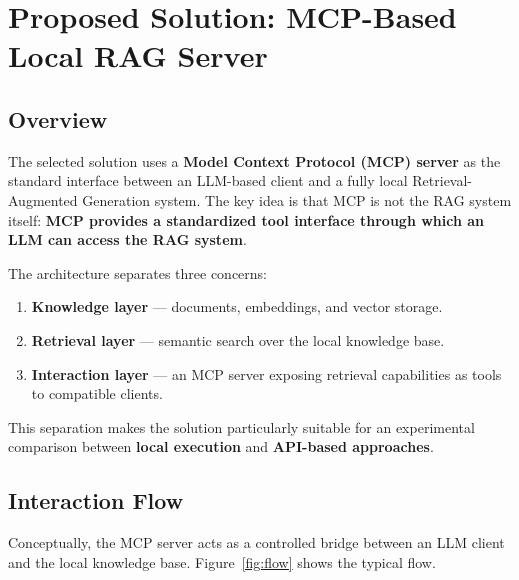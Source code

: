 \documentclass[11pt,a4paper]{article}
\begin{document}
\section{Proposed Solution: MCP-Based Local RAG Server}
\label{sec:solution}

\subsection{Overview}

The selected solution uses a \textbf{Model Context Protocol (MCP) server} as
the standard interface between an LLM-based client and a fully local
Retrieval-Augmented Generation system. The key idea is that MCP is not the
RAG system itself: \textbf{MCP provides a standardized tool interface through
which an LLM can access the RAG system}.

The architecture separates three concerns:

\begin{enumerate}[leftmargin=1.6em]
  \item \textbf{Knowledge layer} --- documents, embeddings, and vector storage.
  \item \textbf{Retrieval layer} --- semantic search over the local knowledge base.
  \item \textbf{Interaction layer} --- an MCP server exposing retrieval capabilities as tools to compatible clients.
\end{enumerate}

This separation makes the solution particularly suitable for an experimental
comparison between \textbf{local execution} and \textbf{API-based approaches}.

\subsection{Interaction Flow}

Conceptually, the MCP server acts as a controlled bridge between an LLM
client and the local knowledge base. Figure~\ref{fig:flow} shows the typical
flow.
\end{document}
